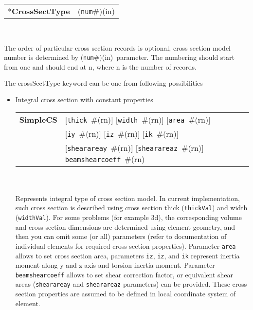 \documentclass[a4paper]{report}
\newcommand{\param}[1]{\texttt{#1}} %
\newcommand{\optional}[1]{[#1]} %
\newcommand{\field}[2]{\param{#1}~\#{\tiny(#2)}} %
\newcommand{\optField}[2]{\optional{\field{#1}{#2}}}
\newcommand{\componentNum}{(\param{num}\#){\tiny(in)}} %
\newcommand{\entKeyword}[1]{*\textbf{#1}} %
\newcommand{\entKeywordInst}[1]{\textbf{#1}} %
\newenvironment{record}[1][]{\begin{tabular}{|ll}}{\end{tabular}\\}
\newcommand{\recentry}[2]{{#1}&{#2}\\}
\newcounter{rcc}
\newenvironment{record}[1][\textwidth]{\setcounter{rcc}{0}\rowcolors{1}{lightgray}{lightgray}\tabularx{#1}{llR} \hline}
               {\endtabularx}
\newcommand{\recentry}[2]{\ifthenelse{\value{rcc}>0}{$\backslash$ \\}{\setcounter{rcc}{1}}{#1}&{#2}&}
\begin{document}
\begin{record}[0.9\textwidth]
  \recentry{\entKeyword{CrossSectType}}{\componentNum}
\end{record}

The order of particular cross section records is optional, cross section model number is determined by \componentNum\ parameter.
The numbering should start from one and should end at n, where n is the number of records.

The crossSectType keyword can be one from following possibilities
\begin{itemize}
\item 
Integral cross section with constant properties\\
\begin{record}[0.9\textwidth]
  \recentry{\entKeywordInst{SimpleCS}}{\optField{thick}{rn} \optField{width}{rn} \optField{area}{rn}}
  \recentry{}{\optField{iy}{rn} \optField{iz}{rn} \optField{ik}{rn}}
  \recentry{}{\optField{shearareay}{rn} \optField{shearareaz}{rn} \field{beamshearcoeff}{rn}}
\end{record}\\
Represents integral type of cross section model. In current
implementation, such cross section is described using cross section
thick (\param{thickVal}) and width (\param{widthVal}). For some
problems (for example 3d), the corresponding volume and cross section dimensions are
determined using element geometry, and then you can omit some (or all) parameters (refer to documentation of individual elements for required cross section properties). Parameter \param{area} allows to set cross section area, parameters \param{iz}, \param{iz}, and \param{ik} represent 
inertia moment along y and z axis and torsion inertia moment. Parameter \param{beamshearcoeff} allows to set shear correction factor, or equivalent 
shear areas (\param{shearareay} and \param{shearareaz} parameters) can be provided. 
These cross section properties are assumed to be defined in local coordinate system of element.\\


\end{itemize}
\end{document}

